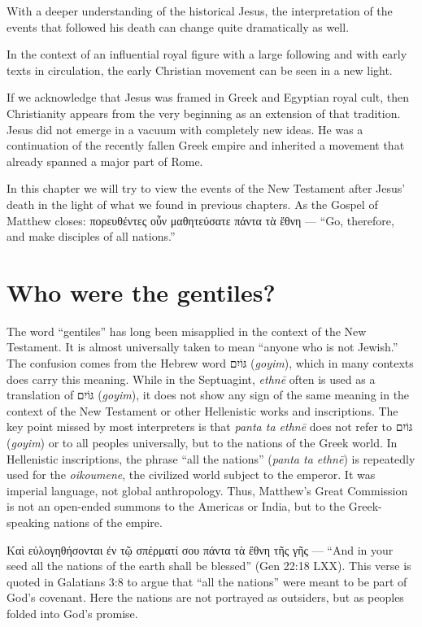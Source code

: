 With a deeper understanding of the historical Jesus, the interpretation of the events that followed his death can change quite dramatically as well.

In the context of an influential royal figure with a large following and with early texts in circulation, the early Christian movement can be seen in a new light.

If we acknowledge that Jesus was framed in Greek and Egyptian royal cult, then Christianity appears from the very beginning as an extension of that tradition.
Jesus did not emerge in a vacuum with completely new ideas.
He was a continuation of the recently fallen Greek empire and inherited a movement that already spanned a major part of Rome.

In this chapter we will try to view the events of the New Testament after Jesus’ death in the light of what we found in previous chapters.
As the Gospel of Matthew closes: πορευθέντες οὖν μαθητεύσατε πάντα τὰ ἔθνη --- “Go, therefore, and make disciples of all nations.”

\section{Who were the gentiles?}\label{sec:who-were-the-gentiles}

The word “gentiles” has long been misapplied in the context of the New Testament.
It is almost universally taken to mean “anyone who is not Jewish.”
The confusion comes from the Hebrew word \texthebrew{גּוֹיִם} (\textit{goyim}), which in many contexts does carry this meaning.
While in the Septuagint, \textit{ethnē} often is used as a translation of \texthebrew{גּוֹיִם} (\textit{goyim}), it does not show any sign of the same meaning in the context of the New Testament or other Hellenistic works and inscriptions.
The key point missed by most interpreters is that \textit{panta ta ethnē} does not refer to \texthebrew{גּוֹיִם} (\textit{goyim}) or to all peoples universally, but to the nations of the Greek world.
In Hellenistic inscriptions, the phrase “all the nations” (\textit{panta ta ethnē}) is repeatedly used for the \textit{oikoumene}, the civilized world subject to the emperor.
It was imperial language, not global anthropology.
Thus, Matthew’s Great Commission is not an open-ended summons to the Americas or India, but to the Greek-speaking nations of the empire.

Καὶ εὐλογηθήσονται ἐν τῷ σπέρματί σου πάντα τὰ ἔθνη τῆς γῆς --- “And in your seed all the nations of the earth shall be blessed” (Gen 22:18 LXX).
This verse is quoted in Galatians 3:8 to argue that “all the nations” were meant to be part of God’s covenant.
Here the nations are not portrayed as outsiders, but as peoples folded into God’s promise.

